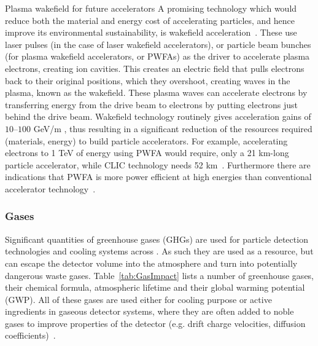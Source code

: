 \documentclass[../SustainableHEP.tex]{subfiles}
\begin{document}
\begin{casestudy}{Plasma wakefield for future accelerators}%
\noindent  A promising technology which would reduce both the material and energy cost of accelerating particles, and hence improve its environmental sustainability, is wakefield acceleration~\cite{wakefield1}.  These use laser pulses (in the case of laser wakefield accelerators), or particle beam bunches (for plasma wakefield accelerators, or PWFAs) as the driver to accelerate plasma electrons, creating ion cavities.  This creates an electric field that pulls electrons back to their original positions, which they overshoot, creating waves in the plasma, known as the wakefield.  These plasma waves can accelerate electrons by transferring energy from the drive beam to electrons by putting electrons just behind the drive beam.  Wakefield technology routinely gives acceleration gains of $10$--$100$ GeV/m \cite{wakefield1}, thus resulting in a significant reduction of the resources required (materials, energy) to build particle accelerators.  For example, accelerating electrons to 1 TeV of energy using PWFA would require, \eg only a 21 km-long particle accelerator, while CLIC technology needs 52 km~\cite{wakefield2}.  Furthermore there are indications that PWFA is more power efficient at high energies than conventional accelerator technology~\cite{wakefield2}.
\end{casestudy}

\subsubsection{Gases}

Significant quantities of greenhouse gases (GHGs) are used for particle detection technologies and cooling systems across \ACR. As such they are used as a resource, but can escape the detector volume into the atmosphere and turn into potentially dangerous waste gases. Table~\ref{tab:GasImpact} lists a number of greenhouse gases, their chemical formula, atmospheric lifetime and their global warming potential (GWP). All of these gases are used either for cooling purpose or active ingredients in gaseous detector systems, where they are often added to noble gases to improve properties of the detector (e.g. drift charge velocities, diffusion coefficients)~\cite{Sauli:2014cyf}.
    
\end{document}

